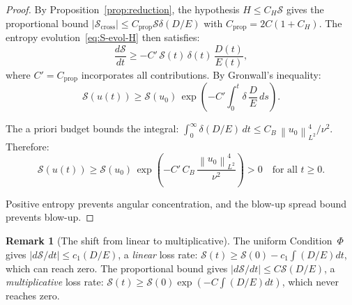 \documentclass[11pt]{article}
\theoremstyle{definition}
\newtheorem{remark}[theorem]{Remark}
\newcommand{\norm}[1]{\left\| #1 \right\|}
\newcommand{\cS}{\mathcal{S}}
\begin{document}
\begin{proof}
By Proposition~\ref{prop:reduction}, the hypothesis
$H \leq C_H\cS$ gives the proportional bound
$|\cS_{\mathrm{cross}}| \leq C_{\mathrm{prop}}\cS\delta(D/E)$
with $C_{\mathrm{prop}} = 2C(1+C_H)$.
The entropy evolution~\eqref{eq:S-evol-H} then
satisfies:
\begin{equation}
\frac{d\cS}{dt}
\geq -C'\,\cS(t)\,\delta(t)\,\frac{D(t)}{E(t)},
\end{equation}
where $C' = C_{\mathrm{prop}}$ incorporates all
contributions.
By Gronwall's inequality:
\begin{equation}\label{eq:gronwall-bound}
\cS(u(t)) \geq \cS(u_0)\,
\exp\!\left(-C'\int_0^t
\delta\,\frac{D}{E}\,ds\right).
\end{equation}

The a priori budget bounds the integral:
$\int_0^\infty \delta(D/E)\,dt
\leq C_B\,\norm{u_0}_{L^2}^4/\nu^2$.
Therefore:
\begin{equation}
\cS(u(t)) \geq \cS(u_0)\,
\exp\!\left(-C'\,C_B\,
\frac{\norm{u_0}_{L^2}^4}{\nu^2}\right) > 0
\quad\text{for all } t \geq 0.
\end{equation}

Positive entropy prevents angular concentration,
and the blow-up spread bound prevents blow-up.
\end{proof}

\begin{remark}[The shift from linear to multiplicative]
The uniform Condition~$\Phi$ gives
$|d\cS/dt| \leq c_1(D/E)$, a \emph{linear}
loss rate: $\cS(t) \geq \cS(0) - c_1\int(D/E)dt$,
which can reach zero.
The proportional bound gives
$|d\cS/dt| \leq C\cS(D/E)$, a \emph{multiplicative}
loss rate: $\cS(t) \geq \cS(0)\exp(-C\int(D/E)dt)$,
which never reaches zero.
\end{remark}
\end{document}
